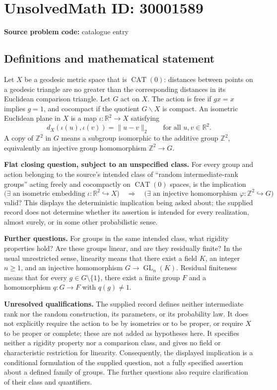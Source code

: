 \documentclass[11pt]{article}
\newcommand{\Z}{\mathbb{Z}}
\newcommand{\R}{\mathbb{R}}
\begin{document}
\section*{UnsolvedMath ID: 30001589}
\textbf{Source problem code:} catalogue entry
\subsection{Definitions and mathematical statement}
Let \(X\) be a geodesic metric space that is \(\operatorname{CAT}(0)\): distances between points on a geodesic triangle are no greater than the corresponding distances in its Euclidean comparison triangle. Let \(G\) act on \(X\). The action is free if \(gx=x\) implies \(g=1\), and cocompact if the quotient \(G\backslash X\) is compact. An isometric Euclidean plane in \(X\) is a map \(\iota:\R^2\to X\) satisfying
\[
 d_X(\iota(u),\iota(v))=\|u-v\|_2
 \qquad\text{for all }u,v\in\R^2.
\]
A copy of \(\Z^2\) in \(G\) means a subgroup isomorphic to the additive group \(\Z^2\), equivalently an injective group homomorphism \(\Z^2\to G\).

\textbf{Flat closing question, subject to an unspecified class.} For every group and action belonging to the source's intended class of ``random intermediate-rank groups'' acting freely and cocompactly on \(\operatorname{CAT}(0)\) spaces, is the implication
\[
 \bigl(\exists\text{ an isometric embedding }\iota:\R^2\hookrightarrow X\bigr)
 \quad\Longrightarrow\quad
 \bigl(\exists\text{ an injective homomorphism }\varphi:\Z^2\hookrightarrow G\bigr)
\]
valid? This displays the deterministic implication being asked about; the supplied record does not determine whether its assertion is intended for every realization, almost surely, or in some other probabilistic sense.

\textbf{Further questions.} For groups in the same intended class, what rigidity properties hold? Are these groups linear, and are they residually finite? In the usual unrestricted sense, linearity means that there exist a field \(K\), an integer \(n\geq 1\), and an injective homomorphism \(G\to\operatorname{GL}_n(K)\). Residual finiteness means that for every \(g\in G\setminus\{1\}\), there exist a finite group \(F\) and a homomorphism \(q:G\to F\) with \(q(g)\neq 1\).

\textbf{Unresolved qualifications.} The supplied record defines neither intermediate rank nor the random construction, its parameters, or its probability law. It does not explicitly require the action to be by isometries or to be proper, or require \(X\) to be proper or complete; these are not added as hypotheses here. It specifies neither a rigidity property nor a comparison class, and gives no field or characteristic restriction for linearity. Consequently, the displayed implication is a conditional formulation of the supplied question, not a fully specified assertion about a defined family of groups. The further questions also require clarification of their class and quantifiers.
\end{document}
